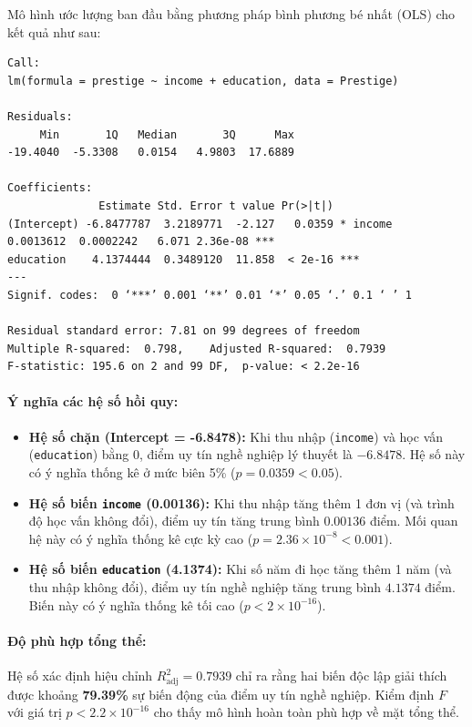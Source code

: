 \documentclass[12pt, a4paper]{article}
\begin{document}
	Mô hình ước lượng ban đầu bằng phương pháp bình phương bé nhất (OLS) cho kết quả như sau:
\begin{verbatim}
Call:
lm(formula = prestige ~ income + education, data = Prestige)

Residuals:
     Min       1Q   Median       3Q      Max 
-19.4040  -5.3308   0.0154   4.9803  17.6889 

Coefficients:
              Estimate Std. Error t value Pr(>|t|)    
(Intercept) -6.8477787  3.2189771  -2.127   0.0359 * income       0.0013612  0.0002242   6.071 2.36e-08 ***
education    4.1374444  0.3489120  11.858  < 2e-16 ***
---
Signif. codes:  0 ‘***’ 0.001 ‘**’ 0.01 ‘*’ 0.05 ‘.’ 0.1 ‘ ’ 1

Residual standard error: 7.81 on 99 degrees of freedom
Multiple R-squared:  0.798,    Adjusted R-squared:  0.7939 
F-statistic: 195.6 on 2 and 99 DF,  p-value: < 2.2e-16
\end{verbatim}

	\paragraph{Ý nghĩa các hệ số hồi quy:}
	\begin{itemize}
		\item \textbf{Hệ số chặn (Intercept = -6.8478):} Khi thu nhập (\texttt{income}) và học vấn (\texttt{education}) bằng 0, điểm uy tín nghề nghiệp lý thuyết là $-6.8478$. Hệ số này có ý nghĩa thống kê ở mức biên 5\% ($p = 0.0359 < 0.05$).
		\item \textbf{Hệ số biến \texttt{income} (0.00136):} Khi thu nhập tăng thêm 1 đơn vị (và trình độ học vấn không đổi), điểm uy tín tăng trung bình $0.00136$ điểm. Mối quan hệ này có ý nghĩa thống kê cực kỳ cao ($p = 2.36 \times 10^{-8} < 0.001$).
		\item \textbf{Hệ số biến \texttt{education} (4.1374):} Khi số năm đi học tăng thêm 1 năm (và thu nhập không đổi), điểm uy tín nghề nghiệp tăng trung bình $4.1374$ điểm. Biến này có ý nghĩa thống kê tối cao ($p < 2 \times 10^{-16}$).
	\end{itemize}

	\paragraph{Độ phù hợp tổng thể:} Hệ số xác định hiệu chỉnh $R^2_{\text{adj}} = 0.7939$ chỉ ra rằng hai biến độc lập giải thích được khoảng \textbf{79.39\%} sự biến động của điểm uy tín nghề nghiệp. Kiểm định $F$ với giá trị $p < 2.2 \times 10^{-16}$ cho thấy mô hình hoàn toàn phù hợp về mặt tổng thể.
\end{document}
